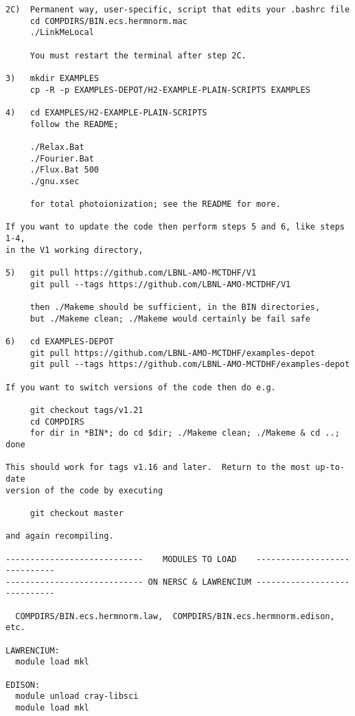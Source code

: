 \begin{verbatim}
2C)  Permanent way, user-specific, script that edits your .bashrc file
     cd COMPDIRS/BIN.ecs.hermnorm.mac
     ./LinkMeLocal

     You must restart the terminal after step 2C.

3)   mkdir EXAMPLES
     cp -R -p EXAMPLES-DEPOT/H2-EXAMPLE-PLAIN-SCRIPTS EXAMPLES

4)   cd EXAMPLES/H2-EXAMPLE-PLAIN-SCRIPTS
     follow the README; 

     ./Relax.Bat
     ./Fourier.Bat 
     ./Flux.Bat 500
     ./gnu.xsec

     for total photoionization; see the README for more.
 
If you want to update the code then perform steps 5 and 6, like steps 1-4, 
in the V1 working directory,

5)   git pull https://github.com/LBNL-AMO-MCTDHF/V1
     git pull --tags https://github.com/LBNL-AMO-MCTDHF/V1

     then ./Makeme should be sufficient, in the BIN directories,
     but ./Makeme clean; ./Makeme would certainly be fail safe

6)   cd EXAMPLES-DEPOT
     git pull https://github.com/LBNL-AMO-MCTDHF/examples-depot
     git pull --tags https://github.com/LBNL-AMO-MCTDHF/examples-depot

If you want to switch versions of the code then do e.g.

     git checkout tags/v1.21
     cd COMPDIRS
     for dir in *BIN*; do cd $dir; ./Makeme clean; ./Makeme & cd ..; done

This should work for tags v1.16 and later.  Return to the most up-to-date 
version of the code by executing

     git checkout master

and again recompiling.

----------------------------    MODULES TO LOAD    -----------------------------
---------------------------- ON NERSC & LAWRENCIUM -----------------------------

  COMPDIRS/BIN.ecs.hermnorm.law,  COMPDIRS/BIN.ecs.hermnorm.edison, etc.

LAWRENCIUM:
  module load mkl

EDISON:
  module unload cray-libsci
  module load mkl
\end{verbatim}
